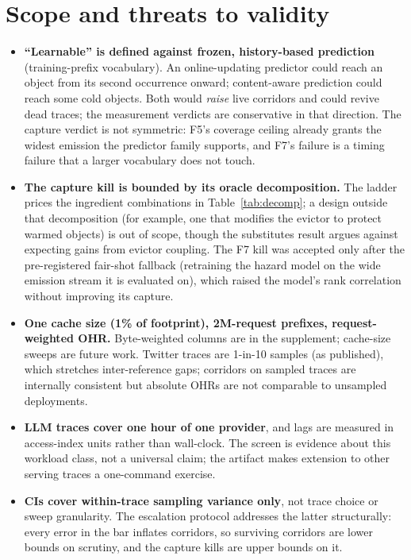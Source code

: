 \documentclass[11pt]{article}
\begin{document}
\section{Scope and threats to validity}
\begin{itemize}\itemsep0.1em
\item \textbf{``Learnable'' is defined against frozen, history-based prediction} (training-prefix vocabulary). An online-updating predictor could reach an object from its second occurrence onward; content-aware prediction could reach some cold objects. Both would \emph{raise} live corridors and could revive dead traces; the measurement verdicts are conservative in that direction. The capture verdict is not symmetric: F5's coverage ceiling already grants the widest emission the predictor family supports, and F7's failure is a timing failure that a larger vocabulary does not touch.
\item \textbf{The capture kill is bounded by its oracle decomposition.} The ladder prices the ingredient combinations in Table~\ref{tab:decomp}; a design outside that decomposition (for example, one that modifies the evictor to protect warmed objects) is out of scope, though the substitutes result argues against expecting gains from evictor coupling. The F7 kill was accepted only after the pre-registered fair-shot fallback (retraining the hazard model on the wide emission stream it is evaluated on), which raised the model's rank correlation without improving its capture.
\item \textbf{One cache size (1\% of footprint), 2M-request prefixes, request-weighted OHR.} Byte-weighted columns are in the supplement; cache-size sweeps are future work. Twitter traces are 1-in-10 samples (as published), which stretches inter-reference gaps; corridors on sampled traces are internally consistent but absolute OHRs are not comparable to unsampled deployments.
\item \textbf{LLM traces cover one hour of one provider}, and lags are measured in access-index units rather than wall-clock. The screen is evidence about this workload class, not a universal claim; the artifact makes extension to other serving traces a one-command exercise.
\item \textbf{CIs cover within-trace sampling variance only}, not trace choice or sweep granularity. The escalation protocol addresses the latter structurally: every error in the bar inflates corridors, so surviving corridors are lower bounds on scrutiny, and the capture kills are upper bounds on it.
\end{itemize}
\end{document}
